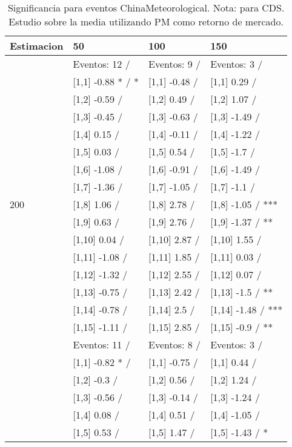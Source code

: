 \begin{table}

\caption{Significancia para eventos ChinaMeteorological. Nota: para CDS. Estudio sobre la media utilizando PM como retorno de mercado.}
\centering
\begin{tabular}[t]{llll}
\toprule
Estimacion & 50 & 100 & 150\\
\midrule
 & Eventos:  12 / & Eventos:  9 / & Eventos:  3 /\\
 & {}[1,1] -0.88 * / * & {}[1,1] -0.48  / & {}[1,1] 0.29  /\\
 & {}[1,2] -0.59  / & {}[1,2] 0.49  / & {}[1,2] 1.07  /\\
 & {}[1,3] -0.45  / & {}[1,3] -0.63  / & {}[1,3] -1.49  /\\
 & {}[1,4] 0.15  / & {}[1,4] -0.11  / & {}[1,4] -1.22  /\\
\addlinespace
 & {}[1,5] 0.03  / & {}[1,5] 0.54  / & {}[1,5] -1.7  /\\
 & {}[1,6] -1.08  / & {}[1,6] -0.91  / & {}[1,6] -1.49  /\\
 & {}[1,7] -1.36  / & {}[1,7] -1.05  / & {}[1,7] -1.1  /\\
200 & {}[1,8] 1.06  / & {}[1,8] 2.78  / & {}[1,8] -1.05  / ***\\
 & {}[1,9] 0.63  / & {}[1,9] 2.76  / & {}[1,9] -1.37  / **\\
\addlinespace
 & {}[1,10] 0.04  / & {}[1,10] 2.87  / & {}[1,10] 1.55  /\\
 & {}[1,11] -1.08  / & {}[1,11] 1.85  / & {}[1,11] 0.03  /\\
 & {}[1,12] -1.32  / & {}[1,12] 2.55  / & {}[1,12] 0.07  /\\
 & {}[1,13] -0.75  / & {}[1,13] 2.42  / & {}[1,13] -1.5  / **\\
 & {}[1,14] -0.78  / & {}[1,14] 2.5  / & {}[1,14] -1.48  / ***\\
\addlinespace
 & {}[1,15] -1.11  / & {}[1,15] 2.85  / & {}[1,15] -0.9  / **\\
 & Eventos:  11 / & Eventos:  8 / & Eventos:  3 /\\
 & {}[1,1] -0.82 * / & {}[1,1] -0.75  / & {}[1,1] 0.44  /\\
 & {}[1,2] -0.3  / & {}[1,2] 0.56  / & {}[1,2] 1.24  /\\
 & {}[1,3] -0.56  / & {}[1,3] -0.14  / & {}[1,3] -1.24  /\\
\addlinespace
 & {}[1,4] 0.08  / & {}[1,4] 0.51  / & {}[1,4] -1.05  /\\
 & {}[1,5] 0.53  / & {}[1,5] 1.47  / & {}[1,5] -1.43  / *\\

\end{tabular}
\end{table}
